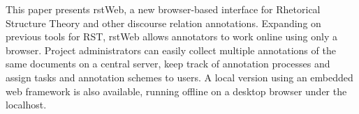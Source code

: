 This paper presents rstWeb, a new browser-based interface for Rhetorical Structure Theory and other discourse relation annotations. Expanding on previous tools for RST, rstWeb allows annotators to work online using only a browser. Project administrators can easily collect multiple annotations of the same documents on a central server, keep track of annotation processes and assign tasks and annotation schemes to users. A local version using an embedded web framework is also available, running offline on a desktop browser under the localhost.
